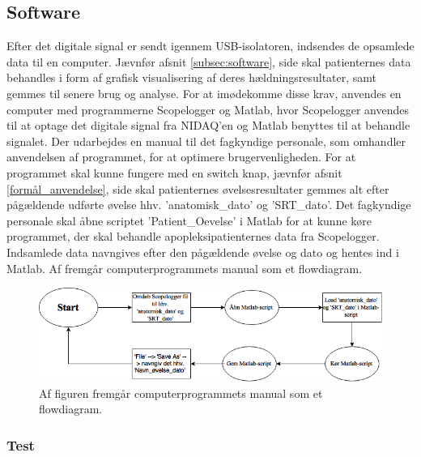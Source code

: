\subsection{Software}
Efter det digitale signal er sendt igennem USB-isolatoren, indsendes de opsamlede data til en computer. Jævnfør afsnit \ref{subsec:software}, side \pageref{subsec:software} skal patienternes data behandles i form af grafisk visualisering af deres hældningsresultater, samt gemmes til senere brug og analyse. For at imødekomme disse krav, anvendes en computer med programmerne Scopelogger og Matlab, hvor Scopelogger anvendes til at optage det digitale signal fra NIDAQ'en og Matlab benyttes til at behandle signalet. Der udarbejdes en manual til det fagkyndige personale, som omhandler anvendelsen af programmet, for at optimere brugervenligheden. 
For at programmet skal kunne fungere med en switch knap, jævnfør afsnit \ref{formål_anvendelse}, side \pageref{formål_anvendelse} skal patienternes øvelsesresultater gemmes alt efter pågældende udførte øvelse hhv. 'anatomisk_dato' og 'SRT_dato'. 
Det fagkyndige personale skal åbne scriptet 'Patient_Oevelse' i Matlab for at kunne køre programmet, der skal behandle apopleksipatienternes data fra Scopelogger. Indsamlede data navngives efter den pågældende øvelse og dato og hentes ind i Matlab. Af  fremgår computerprogrammets manual som et flowdiagram.

\begin{figure}[H] 
	\centering 
	\includegraphics[scale=0.5]{figures/cProblemloesning/Flow_manual.PNG}
	\caption{Af figuren fremgår computerprogrammets manual som et flowdiagram.}
	\label{Flow_manual}
\end{figure} 

\subsubsection{Test}



